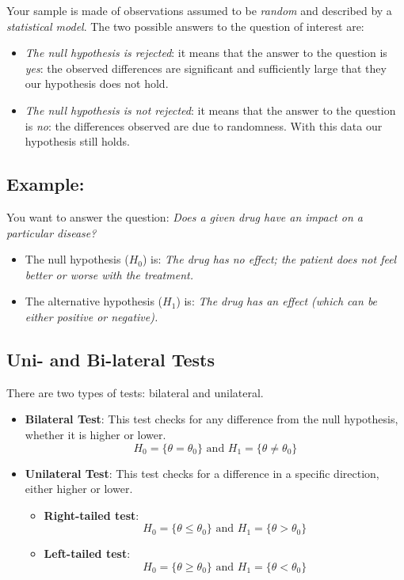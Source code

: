 \documentclass[
  letterpaper,
  DIV=11,
  numbers=noendperiod]{scrreprt}
\providecommand{\tightlist}{%
  \setlength{\itemsep}{0pt}\setlength{\parskip}{0pt}}\usepackage{longtable,booktabs,array}
\begin{document}
Your sample is made of observations assumed to be \emph{random} and
described by a \emph{statistical model}. The two possible answers to the
question of interest are:

\begin{itemize}
\item
  \emph{The null hypothesis is rejected}: it means that the answer to
  the question is \emph{yes}: the observed differences are significant
  and sufficiently large that they our hypothesis does not hold.
\item
  \emph{The null hypothesis is not rejected}: it means that the answer
  to the question is \emph{no}: the differences observed are due to
  randomness. With this data our hypothesis still holds.
\end{itemize}

\subsection{Example:}\label{example-2}

You want to answer the question: \emph{Does a given drug have an impact
on a particular disease?}

\begin{itemize}
\item
  The null hypothesis (\(H_0\)) is: \emph{The drug has no effect; the
  patient does not feel better or worse with the treatment.}
\item
  The alternative hypothesis (\(H_1\)) is: \emph{The drug has an effect
  (which can be either positive or negative).}
\end{itemize}

\subsection{Uni- and Bi-lateral Tests}\label{uni--and-bi-lateral-tests}

There are two types of tests: bilateral and unilateral.

\begin{itemize}
\item
  \textbf{Bilateral Test}: This test checks for any difference from the
  null hypothesis, whether it is higher or lower.
  \[H_0 = \{ \theta = \theta_0 \} \text{ and } H_1 = \{ \theta \neq \theta_0 \}\]
\item
  \textbf{Unilateral Test}: This test checks for a difference in a
  specific direction, either higher or lower.

  \begin{itemize}
  \tightlist
  \item
    \textbf{Right-tailed test}:
    \[H_0 = \{ \theta \leq \theta_0 \} \text{ and } H_1 = \{ \theta > \theta_0 \}\]
  \item
    \textbf{Left-tailed test}:
    \[H_0 = \{ \theta \geq \theta_0 \} \text{ and } H_1 = \{ \theta < \theta_0 \}\]
  \end{itemize}
\end{itemize}
\end{document}
